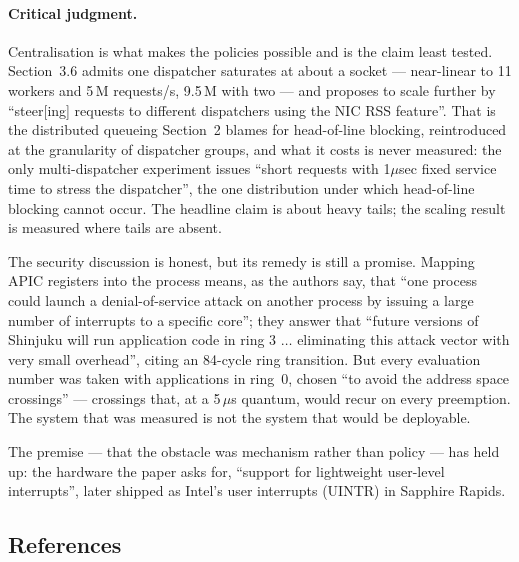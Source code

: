 \paragraph{Critical judgment.}
Centralisation is what makes the policies possible and is the claim least tested.
Section~3.6 admits one dispatcher saturates at about a socket --- near-linear to 11
workers and 5\,M requests/s, 9.5\,M with two --- and proposes to scale further by
``steer[ing] requests to different dispatchers using the NIC RSS feature''. That is the
distributed queueing Section~2 blames for head-of-line blocking, reintroduced at the
granularity of dispatcher groups, and what it costs is never measured: the only
multi-dispatcher experiment issues ``short requests with 1$\mu$sec fixed service time to
stress the dispatcher'', the one distribution under which head-of-line blocking cannot
occur. The headline claim is about heavy tails; the scaling result is measured where
tails are absent.

The security discussion is honest, but its remedy is still a promise. Mapping APIC
registers into the process means, as the authors say, that ``one process could launch a
denial-of-service attack on another process by issuing a large number of interrupts to a
specific core''; they answer that ``future versions of Shinjuku will run application
code in ring 3 $\ldots$ eliminating this attack vector with very small overhead'', citing
an 84-cycle ring transition. But every evaluation number was taken with applications in
ring~0, chosen ``to avoid the address space crossings'' --- crossings that, at a
5\,$\mu$s quantum, would recur on every preemption. The system that was measured is not
the system that would be deployable.

The premise --- that the obstacle was mechanism rather than policy --- has held up: the
hardware the paper asks for, ``support for lightweight user-level interrupts'', later
shipped as Intel's user interrupts (UINTR) in Sapphire Rapids.

\subsection*{References}

